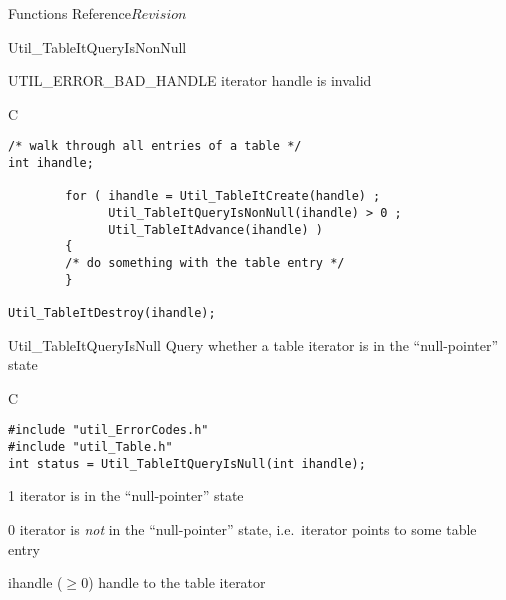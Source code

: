 \begin{cactuspart}{ Functions Reference}{}{$Revision$}
\begin{FunctionDescription}{Util\_TableItQueryIsNonNull}
\begin{ErrorSection}
\begin{Error}{UTIL\_ERROR\_BAD\_HANDLE}
iterator handle is invalid
\end{Error}
\end{ErrorSection}

\begin{ExampleSection}
\begin{Example}{C}
\begin{verbatim}
/* walk through all entries of a table */
int ihandle;

        for ( ihandle = Util_TableItCreate(handle) ;
              Util_TableItQueryIsNonNull(ihandle) > 0 ;
              Util_TableItAdvance(ihandle) )
        {
        /* do something with the table entry */
        }

Util_TableItDestroy(ihandle);
\end{verbatim}
\end{Example}
\end{ExampleSection}
\end{FunctionDescription}


\begin{FunctionDescription}{Util\_TableItQueryIsNull}
\label{Util-TableItQueryIsNull}
Query whether a table iterator is in the ``null-pointer'' state

\begin{SynopsisSection}
\begin{Synopsis}{C}
\begin{verbatim}
#include "util_ErrorCodes.h"
#include "util_Table.h"
int status = Util_TableItQueryIsNull(int ihandle);
\end{verbatim}
\end{Synopsis}
\end{SynopsisSection}

\begin{ResultSection}
\begin{Result}{\rm 1}
iterator is in the ``null-pointer'' state
\end{Result}
\begin{Result}{\rm 0}
iterator is {\em not\/} in the ``null-pointer'' state,
i.e.\ iterator points to some table entry
\end{Result}
\end{ResultSection}

\begin{ParameterSection}
\begin{Parameter}{ihandle ($\ge 0$)}
handle to the table iterator
\end{Parameter}
\end{ParameterSection}


\end{FunctionDescription}
\end{cactuspart}
